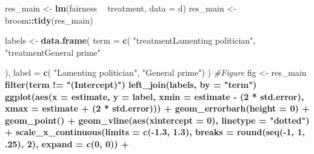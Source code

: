 \documentclass[]{book}
\newenvironment{Shaded}{\begin{snugshade}}{\end{snugshade}}
\newcommand{\KeywordTok}[1]{\textcolor[rgb]{0.13,0.29,0.53}{\textbf{#1}}}
\newcommand{\DataTypeTok}[1]{\textcolor[rgb]{0.13,0.29,0.53}{#1}}
\newcommand{\DecValTok}[1]{\textcolor[rgb]{0.00,0.00,0.81}{#1}}
\newcommand{\FloatTok}[1]{\textcolor[rgb]{0.00,0.00,0.81}{#1}}
\newcommand{\StringTok}[1]{\textcolor[rgb]{0.31,0.60,0.02}{#1}}
\newcommand{\CommentTok}[1]{\textcolor[rgb]{0.56,0.35,0.01}{\textit{#1}}}
\newcommand{\OperatorTok}[1]{\textcolor[rgb]{0.81,0.36,0.00}{\textbf{#1}}}
\newcommand{\NormalTok}[1]{#1}
\begin{document}
\begin{Shaded}
\begin{Highlighting}[]
\NormalTok{res_main <-}\StringTok{  }\KeywordTok{lm}\NormalTok{(fairness }\OperatorTok{~}\StringTok{ }\NormalTok{treatment, }\DataTypeTok{data =}\NormalTok{ d) }
\NormalTok{res_main <-}\StringTok{ }\NormalTok{broom}\OperatorTok{::}\KeywordTok{tidy}\NormalTok{(res_main)}

\NormalTok{labels <-}\StringTok{ }\KeywordTok{data.frame}\NormalTok{(}
  \DataTypeTok{term =} \KeywordTok{c}\NormalTok{(}
    \StringTok{"treatmentLamenting politician"}\NormalTok{,}
    \StringTok{"treatmentGeneral prime"}
    
\NormalTok{  ),}
  \DataTypeTok{label =} \KeywordTok{c}\NormalTok{( }\StringTok{"Lamenting politician"}\NormalTok{,}
             \StringTok{"General prime"}\NormalTok{)}
\NormalTok{)}
\CommentTok{#Figure}
\NormalTok{fig <-}\StringTok{   }\NormalTok{res_main }\OperatorTok{%>%}
\StringTok{  }\KeywordTok{filter}\NormalTok{(term }\OperatorTok{!=}\StringTok{ "(Intercept)"}\NormalTok{) }\OperatorTok{%>%}\StringTok{ }
\StringTok{  }\KeywordTok{left_join}\NormalTok{(labels, }\DataTypeTok{by =} \StringTok{"term"}\NormalTok{) }\OperatorTok{%>%}\StringTok{ }
\StringTok{  }
\StringTok{  }\KeywordTok{ggplot}\NormalTok{(}\KeywordTok{aes}\NormalTok{(}\DataTypeTok{x =}\NormalTok{ estimate, }\DataTypeTok{y =}\NormalTok{ label,}
             \DataTypeTok{xmin =}\NormalTok{ estimate }\OperatorTok{-}\StringTok{ }\NormalTok{(}\DecValTok{2} \OperatorTok{*}\StringTok{ }\NormalTok{std.error),}
             \DataTypeTok{xmax =}\NormalTok{ estimate }\OperatorTok{+}\StringTok{ }\NormalTok{(}\DecValTok{2} \OperatorTok{*}\StringTok{ }\NormalTok{std.error))) }\OperatorTok{+}
\StringTok{   }\KeywordTok{geom_errorbarh}\NormalTok{(}\DataTypeTok{height =} \DecValTok{0}\NormalTok{) }\OperatorTok{+}
\StringTok{  }\KeywordTok{geom_point}\NormalTok{() }\OperatorTok{+}
\StringTok{  }\KeywordTok{geom_vline}\NormalTok{(}\KeywordTok{aes}\NormalTok{(}\DataTypeTok{xintercept =} \DecValTok{0}\NormalTok{), }\DataTypeTok{linetype =} \StringTok{"dotted"}\NormalTok{) }\OperatorTok{+}
\StringTok{  }\KeywordTok{scale_x_continuous}\NormalTok{(}\DataTypeTok{limits =} \KeywordTok{c}\NormalTok{(}\OperatorTok{-}\FloatTok{1.3}\NormalTok{, }\FloatTok{1.3}\NormalTok{),}
                     \DataTypeTok{breaks =} \KeywordTok{round}\NormalTok{(}\KeywordTok{seq}\NormalTok{(}\OperatorTok{-}\DecValTok{1}\NormalTok{, }\DecValTok{1}\NormalTok{, .}\DecValTok{25}\NormalTok{), }\DecValTok{2}\NormalTok{),}
                     \DataTypeTok{expand =} \KeywordTok{c}\NormalTok{(}\DecValTok{0}\NormalTok{, }\DecValTok{0}\NormalTok{)) }\OperatorTok{+}
}}}
\end{Highlighting}
\end{Shaded}
\end{document}
